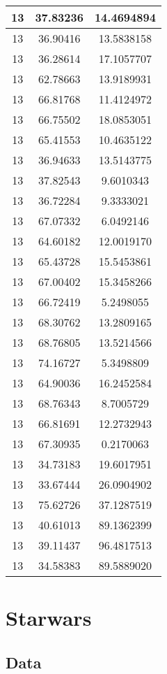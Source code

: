 \documentclass[
]{book}
\begin{document}
\begin{tabular}{c|c|c}
\hline
13 & 37.83236 & 14.4694894\\
\hline
13 & 36.90416 & 13.5838158\\
\hline
13 & 36.28614 & 17.1057707\\
\hline
13 & 62.78663 & 13.9189931\\
\hline
13 & 66.81768 & 11.4124972\\
\hline
13 & 66.75502 & 18.0853051\\
\hline
13 & 65.41553 & 10.4635122\\
\hline
13 & 36.94633 & 13.5143775\\
\hline
13 & 37.82543 & 9.6010343\\
\hline
13 & 36.72284 & 9.3333021\\
\hline
13 & 67.07332 & 6.0492146\\
\hline
13 & 64.60182 & 12.0019170\\
\hline
13 & 65.43728 & 15.5453861\\
\hline
13 & 67.00402 & 15.3458266\\
\hline
13 & 66.72419 & 5.2498055\\
\hline
13 & 68.30762 & 13.2809165\\
\hline
13 & 68.76805 & 13.5214566\\
\hline
13 & 74.16727 & 5.3498809\\
\hline
13 & 64.90036 & 16.2452584\\
\hline
13 & 68.76343 & 8.7005729\\
\hline
13 & 66.81691 & 12.2732943\\
\hline
13 & 67.30935 & 0.2170063\\
\hline
13 & 34.73183 & 19.6017951\\
\hline
13 & 33.67444 & 26.0904902\\
\hline
13 & 75.62726 & 37.1287519\\
\hline
13 & 40.61013 & 89.1362399\\
\hline
13 & 39.11437 & 96.4817513\\
\hline
13 & 34.58383 & 89.5889020\\
\hline
\end{tabular}

\hypertarget{starwars}{%
\chapter{Starwars}\label{starwars}}

\hypertarget{data}{%
\section{Data}\label{data}}
\end{document}
